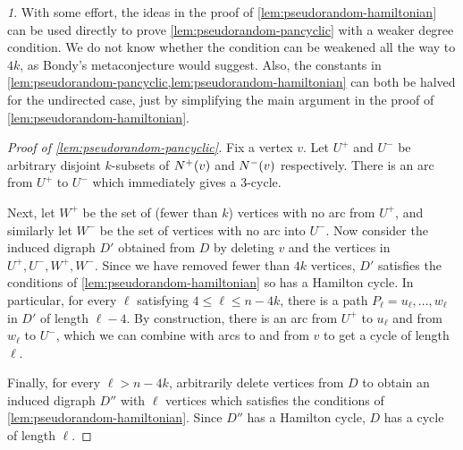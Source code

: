 \documentclass[11pt,english]{article}
\theoremstyle{plain}
\theoremstyle{definition}
\theoremstyle{definition}
\theoremstyle{plain}
\theoremstyle{plain}
\theoremstyle{plain}
\theoremstyle{plain}
\theoremstyle{remark}
\newtheorem{rem}[thm]{\protect\remarkname}
\theoremstyle{remark}
\let\originalleft\left
\let\originalright\right
\renewcommand{\left}{\mathopen{}\mathclose\bgroup\originalleft}
\renewcommand{\right}{\aftergroup\egroup\originalright}
\providecommand{\remarkname}{Remark}
\begin{document}
\begin{rem}
\label{rem:constants}With some effort, the ideas in the proof of
\ref{lem:pseudorandom-hamiltonian} can be used directly to prove
 \ref{lem:pseudorandom-pancyclic} with a weaker degree condition.
We do not know whether the condition can be weakened all the way to
$4k$, as Bondy's metaconjecture would suggest. Also, the constants in \ref{lem:pseudorandom-pancyclic,lem:pseudorandom-hamiltonian}
can both be halved for the undirected case, just by simplifying the
main argument in the proof of \ref{lem:pseudorandom-hamiltonian}.\end{rem}

\begin{proof}
[Proof of \ref{lem:pseudorandom-pancyclic}]Fix a vertex $v$. Let
$U^{+}$ and $U^{-}$ be arbitrary disjoint $k$-subsets of $N^{+}\left(v\right)$
and $N^{-}\left(v\right)$ respectively. There is an arc from $U^{+}$
to $U^{-}$ which immediately gives a 3-cycle.

Next, let $W^{+}$ be the set of (fewer than $k$) vertices with no
arc from $U^{+}$, and similarly let $W^{-}$ be the set of vertices
with no arc into $U^{-}$. Now consider the induced digraph $D'$
obtained from $D$ by deleting $v$ and the vertices in $U^{+},U^{-},W^{+},W^{-}$.
Since we have removed fewer than $4k$ vertices, $D'$ satisfies the
conditions of \ref{lem:pseudorandom-hamiltonian} so has a Hamilton
cycle. In particular, for every $\ell$ satisfying $4\le\ell\le n-4k$,
there is a path $P_{\ell}=u_{\ell},\dots, w_{\ell}$ in $D'$ of length
$\ell-4$. By construction, there is an arc from $U^{+}$ to $u_{\ell}$
and from $w_{\ell}$ to $U^{-}$, which we can combine with arcs to
and from $v$ to get a cycle of length $\ell$.

Finally, for every $\ell>n-4k$, arbitrarily delete vertices from
$D$ to obtain an induced digraph $D''$ with $\ell$ vertices which
satisfies the conditions of \ref{lem:pseudorandom-hamiltonian}. Since
$D''$ has a Hamilton cycle, $D$ has a cycle of length $\ell$.
\end{proof}
\end{document}
